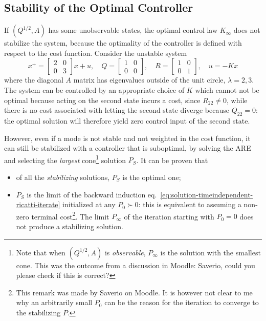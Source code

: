 \subsection{Stability of the Optimal Controller}
\label{sec:stability-optimal-controller}

If $(Q^{1/2},A)$ has some unobservable states, the optimal control law $K_\infty$ does not stabilize the system, because the optimality of the controller is defined with respect to the cost function. Consider the unstable system
\begin{equation*}
  x^+ =
  \begin{bmatrix}
    2 & 0 \\ 0 & 3
  \end{bmatrix}x + u, \quad Q =
  \begin{bmatrix}
    1 & 0 \\ 0 & 0
  \end{bmatrix}, \quad R =
  \begin{bmatrix}
    1 & 0 \\ 0 & 1
  \end{bmatrix},\quad u =-Kx
\end{equation*}
where the diagonal $A$ matrix has eigenvalues outside of the unit circle, $\lambda=2,3$. The system can be controlled by an appropriate choice of $K$ which cannot not be optimal because acting on the second state incurs a cost, since $R_{22}\neq 0$, while there is no cost associated with letting the second state diverge because $Q_{22}=0$: the optimal solution will therefore yield zero control input of the second state.

However, even if a mode is not stable and not weighted in the cost function, it can still be stabilized with a controller that is suboptimal, by solving the ARE and selecting the \emph{largest} cone\footnote{Note that when $(Q^{1/2},A)$ is \emph{observable}, $P_\infty$ is the solution with the smallest cone. This was the outcome from a discussion in Moodle: Saverio, could you please check if this is correct?} solution $P_S$. It can be proven that
\begin{itemize}
\item of all the \emph{stabilizing} solutions, $P_S$ is the optimal one;
\item $P_S$ is the limit of the backward induction eq.~\eqref{eq:solution-timeindependent-ricatti-iterate} initialized at any $P_0\succ 0$: this is equivalent to assuming a non-zero terminal cost\footnote{This remark was made by Saverio on Moodle. It is however not clear to me why an arbitrarily small $P_0$ can be the reason for the iteration to converge to the stabilizing $P$.}. The limit $P_\infty$ of the iteration starting with $P_0=0$ does not produce a stabilizing solution.
\end{itemize}

